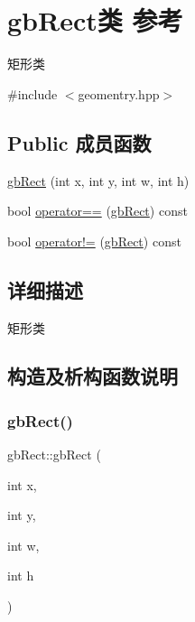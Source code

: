 \hypertarget{classgb_rect}{}\section{gb\+Rect类 参考}
\label{classgb_rect}


矩形类  




{\ttfamily \#include $<$geomentry.\+hpp$>$}

\subsection*{Public 成员函数}
\begin{DoxyCompactItemize}
\item 
\mbox{\hyperlink{classgb_rect_ad87d8d116e21198f08bdcffdbbe6361f}{gb\+Rect}} (int x, int y, int w, int h)
\item 
bool \mbox{\hyperlink{classgb_rect_ab64eca7f0aa12098783fa406e61ded56}{operator==}} (\mbox{\hyperlink{classgb_rect}{gb\+Rect}}) const
\item 
bool \mbox{\hyperlink{classgb_rect_af45d974ddde70f8f20dfda8253cbf9ed}{operator!=}} (\mbox{\hyperlink{classgb_rect}{gb\+Rect}}) const
\end{DoxyCompactItemize}


\subsection{详细描述}
矩形类 

\subsection{构造及析构函数说明}
\mbox{\label{classgb_rect_ad87d8d116e21198f08bdcffdbbe6361f}} 
\subsubsection{\texorpdfstring{gbRect()}{gbRect()}}
{\footnotesize\ttfamily gb\+Rect\+::gb\+Rect (\begin{DoxyParamCaption}\item[{int}]{x,  }\item[{int}]{y,  }\item[{int}]{w,  }\item[{int}]{h }\end{DoxyParamCaption})}



